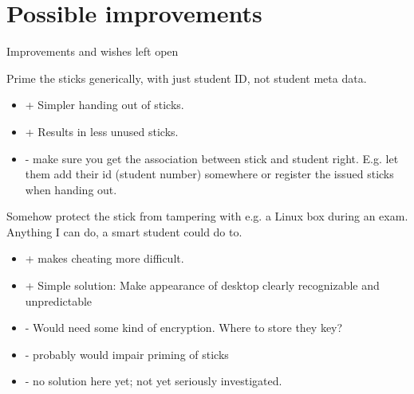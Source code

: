 \section{Possible improvements}
\begin{frame}[shrink]{Improvements and wishes left open}
  \begin{description}[short]
  \item[Simplification] Prime the sticks generically, with just student ID, not
    student meta data.
    \begin{itemize}
    \item + Simpler handing out of sticks.
    \item + Results in less unused sticks.
    \item - make sure you get the association between stick and
      student right. E.g. let them add their id (student number)
      somewhere or register the issued sticks when handing out.
    \end{itemize}
  \item[Security and authenticity] Somehow protect the stick from
    tampering with e.g. a Linux box during an exam. Anything I can do, 
    a smart student could do to.\InlineMwha
    \begin{itemize}
    \item + makes cheating more difficult.
    \item + Simple solution: Make appearance of desktop clearly
      recognizable and unpredictable
    \item - Would need some kind of encryption. Where to store they key?
    \item - probably would impair priming of sticks
    \item - no solution here yet; not yet seriously investigated.
    \end{itemize}
  \end{description}
\end{frame}
